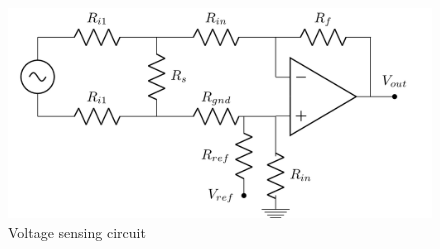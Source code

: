 \begin{figure} 
	\centering
	\includegraphics[width=0.8\linewidth]{tikz/voltageCircuit}
	\caption[Voltage sensing circuit]{Voltage sensing circuit}
	\label{fig:voltageCircuit}
	\vspace*{-3ex}
\end{figure}
